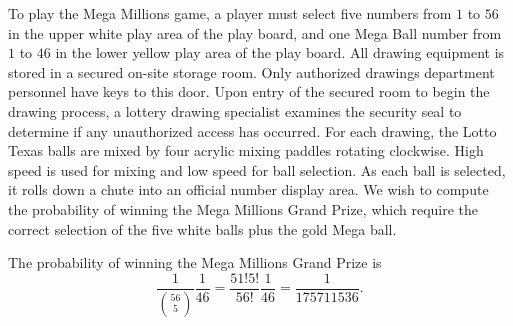 \begin{example}
To play the Mega Millions game, a player must select five numbers from $1$ to $56$ in the upper white play area of the play board, and one Mega Ball number from $1$ to $46$ in the lower yellow play area of the play board.
All drawing equipment is stored in a secured on-site storage room.
Only authorized drawings department personnel have keys to this door.
Upon entry of the secured room to begin the drawing process, a lottery drawing specialist examines the security seal to determine if any unauthorized access has occurred.
For each drawing, the Lotto Texas balls are mixed by four acrylic mixing paddles rotating clockwise.
High speed is used for mixing and low speed for ball selection.
As each ball is selected, it rolls down a chute into an official number display area.
We wish to compute the probability of winning the Mega Millions Grand Prize, which require the correct selection of the five white balls plus the gold Mega ball.

The probability of winning the Mega Millions Grand Prize is
\begin{equation*}
\frac{1}{\binom{56}{5}} \frac{1}{46}
= \frac{51!5!}{56!} \frac{1}{46}
= \frac{1}{175 711 536} .
\end{equation*}
\end{example}

